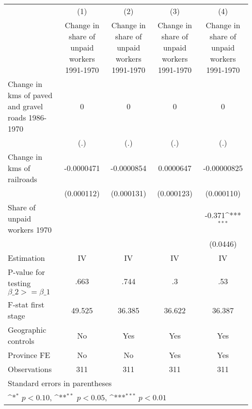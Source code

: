 {
\def\sym#1{\ifmmode^{#1}\else\(^{#1}\)\fi}
\begin{tabular}{l*{4}{c}}
\hline\hline
                    &\multicolumn{1}{c}{(1)}&\multicolumn{1}{c}{(2)}&\multicolumn{1}{c}{(3)}&\multicolumn{1}{c}{(4)}\\
                    &\multicolumn{1}{c}{Change in share of unpaid workers 1991-1970}&\multicolumn{1}{c}{Change in share of unpaid workers 1991-1970}&\multicolumn{1}{c}{Change in share of unpaid workers 1991-1970}&\multicolumn{1}{c}{Change in share of unpaid workers 1991-1970}\\
\hline
Change in kms of paved and gravel roads 1986-1970&           0         &           0         &           0         &           0         \\
                    &         (.)         &         (.)         &         (.)         &         (.)         \\
[1em]
Change in kms of railroads&  -0.0000471         &  -0.0000854         &   0.0000647         & -0.00000825         \\
                    &  (0.000112)         &  (0.000131)         &  (0.000123)         &  (0.000110)         \\
[1em]
Share of unpaid workers 1970&                     &                     &                     &      -0.371\sym{***}\\
                    &                     &                     &                     &    (0.0446)         \\
\hline
Estimation          &          IV         &          IV         &          IV         &          IV         \\
P-value for testing $\beta\_2 >= \beta\_1$&        .663         &        .744         &          .3         &         .53         \\
F-stat first stage  &      49.525         &      36.385         &      36.622         &      36.387         \\
Geographic controls &          No         &         Yes         &         Yes         &         Yes         \\
Province FE         &          No         &          No         &         Yes         &         Yes         \\
Observations        &         311         &         311         &         311         &         311         \\
\hline\hline
\multicolumn{5}{l}{\footnotesize Standard errors in parentheses}\\
\multicolumn{5}{l}{\footnotesize \sym{*} \(p<0.10\), \sym{**} \(p<0.05\), \sym{***} \(p<0.01\)}\\
\end{tabular}
}
